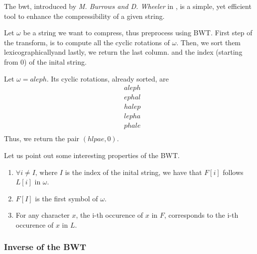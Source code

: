 \documentclass{subfiles}
\begin{document}
    The \gls{bwt}, introduced by \emph{M. Burrows \emph{and} D. Wheeler} in \cite{burrows1994},
    is a simple, yet efficient tool to enhance the compressibility of a given string.

    Let \(\omega\) be a string we want to compress, thus preprocess using BWT.
    First step of the transform, is to compute all the cyclic rotations of \(\omega\).
    Then, we sort them lexicographically\footnotemark[3] and lastly, 
    we return the last column. 
    and the index (starting from 0) of the inital string.

    \begin{example*}
        Let \(\omega = aleph\). Its cyclic rotations, already sorted, are
        \[\begin{aligned}
            & aleph \\ 
            & ephal \\
            & halep \\
            & lepha \\
            & phale \\
        \end{aligned}\]
        Thus, we return the pair \((hlpae, 0)\).
    \end{example*}

    Let us point out some interesting properties of the BWT.
        \begin{enumerate}
            \item \(\forall i \ne I \text{, where } I\) is the index of the inital string,
                we have that \(F[i]\) follows \(L[i]\) in \(\omega\).
            \item \(F[I]\) is the first symbol of \(\omega\).
            \item For any character \(x\), the i-th occurence of \(x \text{ in } F\),
                corresponds to the i-th occurence of \(x \text{ in } L\).
        \end{enumerate}


    \subsubsection{Inverse of the BWT}
    
\end{document}
